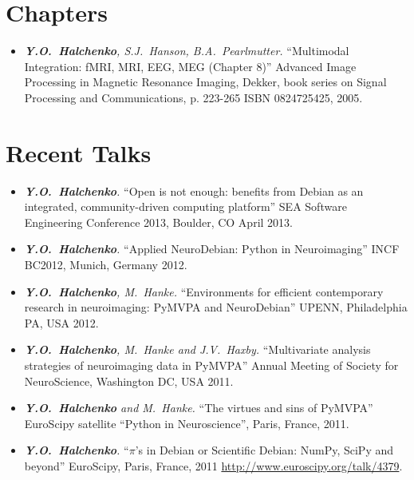 \documentclass[12pt,overlapped,line]{res}
\newcommand{\mtitle}[1]{``#1''}
\newcommand{\mauthors}[1]{ \textit{#1.}}
\newcommand{\mwhere}[1]{#1.}
\begin{document}
\begin{resume}
\section{Chapters}

\begin{itemize}
  \item
    \mauthors{\textbf{Y.O.~Halchenko}, S.J.~Hanson, B.A.~Pearlmutter}
    \mtitle{Multimodal Integration: fMRI, MRI, EEG, MEG (Chapter 8)}
    \mwhere{Advanced Image Processing in Magnetic Resonance Imaging,
      Dekker, book series on Signal Processing and Communications, p. 223-265
      ISBN 0824725425, 2005}
 \end{itemize}

\section{Recent Talks}

 \begin{itemize}

 \item
   \mauthors{\textbf{Y.O.~Halchenko}}
   \mtitle{Open is not enough: benefits from Debian as an integrated,
     community-driven computing platform}
   \mwhere{SEA Software Engineering Conference 2013, Boulder, CO April
     2013}

 \item
   \mauthors{\textbf{Y.O.~Halchenko}}
   \mtitle{Applied NeuroDebian: Python in Neuroimaging}
   \mwhere{INCF BC2012, Munich, Germany 2012}

 \item
   \mauthors{\textbf{Y.O.~Halchenko}, M.~Hanke}
   \mtitle{Environments for efficient contemporary research in neuroimaging: {PyMVPA} and {NeuroDebian}}
   \mwhere{UPENN, Philadelphia PA, USA 2012}

 \item
   \mauthors{\textbf{Y.O.~Halchenko}, M.~Hanke and J.V.~Haxby}
   \mtitle{Multivariate analysis strategies of neuroimaging data in PyMVPA}
   \mwhere{Annual Meeting of Society for NeuroScience, Washington DC,  USA 2011}

 \item
   \mauthors{\textbf{Y.O.~Halchenko} and M.~Hanke}
   \mtitle{The virtues and sins of PyMVPA}
   \mwhere{EuroScipy satellite ``Python in Neuroscience'', Paris, France, 2011}


 \item
   \mauthors{\textbf{Y.O.~Halchenko}}
   \mtitle{$\pi$'s in Debian or Scientific Debian: NumPy, SciPy and beyond}
   \mwhere{EuroScipy, Paris, France, 2011
     \url{http://www.euroscipy.org/talk/4379}}


\end{itemize}
\end{resume}
\end{document}
